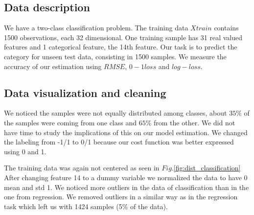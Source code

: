 \subsection{Data description}
We have a two-class classification problem. The training data $Xtrain$ contains 1500 observations, each 32 dimensional. One training sample has 31 real valued features and 1 categorical feature, the 14th feature. Our task is to predict the category for unseen test data, consisting in 1500 samples. We measure the accuracy of our estimation using $RMSE$, $0-1 loss$ and $log-loss$. 

\subsection{Data visualization and cleaning}
We noticed the samples were not equally distributed among classes, about $35\%$ of the samples were coming from one class and $65\%$ from the other. We did not have time to study the implications of this on our model estimation. We changed the labeling from -1/1 to 0/1 because our cost function was better expressed using 0 and 1.

The training data was again not centered as seen in $Fig.$\ref{fig:dist_classification}
 After changing feature 14 to a dummy variable we normalized the data to have 0 mean and std 1. We noticed more outliers in the data of classification than in the one from regression. We removed outliers in a similar way as in the regression task which left us with 1424 samples (5$\%$ of the data).


